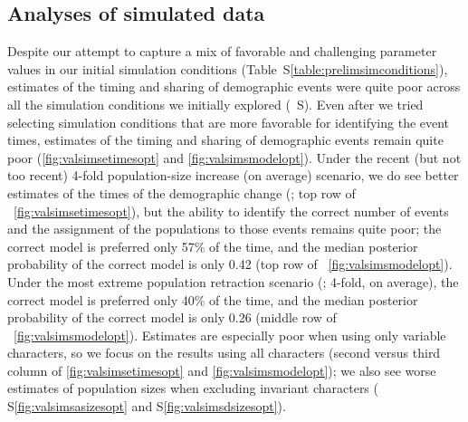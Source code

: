 \subsection{Analyses of simulated data}


Despite our attempt to capture a mix of favorable and challenging parameter
values in our initial simulation conditions (Table~S\ref{table:prelimsimconditions}),
estimates of the timing and sharing of demographic events were quite poor
across all the simulation conditions we initially explored
(\figs{}~S).
Even after we tried selecting simulation conditions that are more favorable for
identifying the event times, estimates of the timing and
sharing of demographic events remain quite poor
(\figs \ref{fig:valsimsetimesopt} and \ref{fig:valsimsmodelopt}).
Under the recent (but not too recent) 4-fold population-size increase (on
average) scenario, we do see better estimates of the times of the demographic
change
(\vsimfourinc; top row of \fig{}~\ref{fig:valsimsetimesopt}),
but the ability to identify the correct number of events and the assignment of
the populations to those events remains quite poor;
the correct model is preferred only 57\% of the time, and the
median posterior probability of the correct model is only 0.42
(top row of \fig{}~\ref{fig:valsimsmodelopt}).
Under the most extreme population retraction scenario
(\vsimfourdec; 4-fold, on average),
the correct model is preferred only 40\% of the time, and the median
posterior probability of the correct model is only 0.26
(middle row of \fig{}~\ref{fig:valsimsmodelopt}).
Estimates are especially poor when using only variable characters,
so we focus on the results using all characters
(second versus third column of \figs
\ref{fig:valsimsetimesopt}
and
\ref{fig:valsimsmodelopt});
we also see worse estimates of population sizes when excluding invariant
characters
(\figs
S\ref{fig:valsimsasizesopt}
and
S\ref{fig:valsimsdsizesopt}).

\ifembed{

}{}


